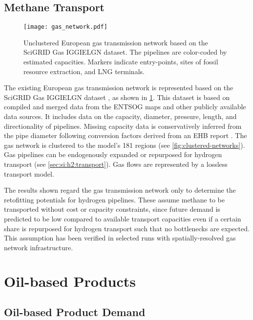 \subsection{Methane Transport}
\label{sec:si:methane:transport}

\begin{figure}
    \texttt{[image: gas\_network.pdf]}
    \label{fig:gas-raw}
    \caption{Unclustered European gas transmission network based on the
    SciGRID Gas IGGIELGN dataset. The pipelines are color-coded by estimated capacities. Markers indicate entry-points, sites of fossil resource extraction, and LNG terminals.}
\end{figure}

The existing European gas transmission network is represented based on the
SciGRID Gas IGGIELGN dataset , as shown in
\cref{fig:gas-raw}. This dataset is based on compiled and merged data from the
ENTSOG maps  and other publicly available
data sources. It includes data on the capacity, diameter, pressure, length, and
directionality of pipelines. Missing capacity data is conservatively inferred
from the pipe diameter following conversion factors derived from an EHB report
. The gas network is clustered to the
model's 181 regions (see \cref{fig:clustered-networks}). Gas pipelines can be
endogenously expanded or repurposed for hydrogen transport (see
\cref{sec:si:h2:transport}). Gas flows are represented by a lossless transport
model.

The results shown regard the gas transmission network only to determine the
retofitting potentials for hydrogen pipelines. These assume methane to be
transported without cost or capacity constraints, since future demand is
predicted to be low compared to available transport capacities even if a certain
share is repurposed for hydrogen transport such that no bottlenecks are
expected. This assumption has been verified in selected runs with
spatially-resolved gas network infrastructure.

\section{Oil-based Products}
\label{sec:si:oil}

\subsection{Oil-based Product Demand}
\label{sec:si:demand}

